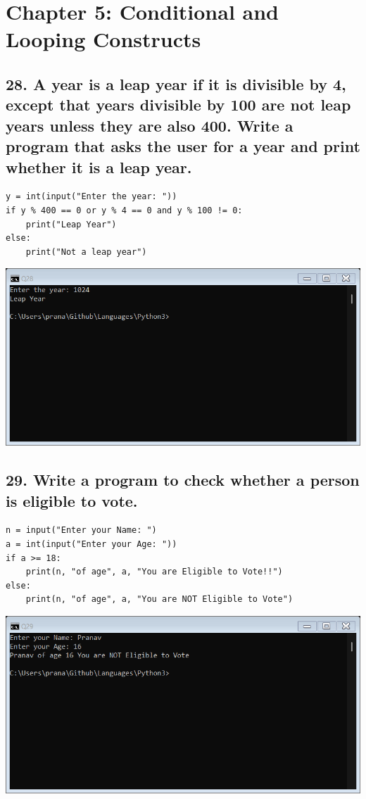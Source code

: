 \documentclass[12pt]{article}
\begin{document}
\section*{Chapter 5: Conditional and Looping Constructs}

\subsection*{28. A year is a leap year if it is divisible by 4, except that years divisible by 100 are not leap years unless they are also 400. Write a program that asks the user for a year and print whether it is a leap year.}
\begin{verbatim}
y = int(input("Enter the year: "))
if y % 400 == 0 or y % 4 == 0 and y % 100 != 0:
    print("Leap Year")
else:
    print("Not a leap year")
\end{verbatim}
\includegraphics[width=\linewidth]{images/28.png}

\subsection*{29. Write a program to check whether a person is eligible to vote.}
\begin{verbatim}
n = input("Enter your Name: ")
a = int(input("Enter your Age: "))
if a >= 18:
    print(n, "of age", a, "You are Eligible to Vote!!")
else:
    print(n, "of age", a, "You are NOT Eligible to Vote")
\end{verbatim}
\includegraphics[width=\linewidth]{images/29.png}
\end{document}
